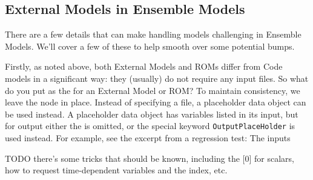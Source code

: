 \subsection{External Models in Ensemble Models}
There are a few details that can make handling  models challenging in Ensemble Models.
We'll cover a few of these to help smooth over some potential bumps.

Firstly, as noted above, both External Models and ROMs differ from Code models in a significant way: they
(usually) do not require any input files.  So what do you put as the  for an External Model or
ROM?  To maintain consistency, we leave the  node in place.  Instead of specifying a file, a
placeholder data object can be used instead.  A placeholder data object has variables listed in its input, but
for output either the  is omitted, or the special keyword \texttt{OutputPlaceHolder} is used
instead.  For example, see the excerpt from a regression test:
The inputs



 TODO there's some tricks that should be known, including the [0] for scalars, how to request time-dependent
 variables and the index, etc.
